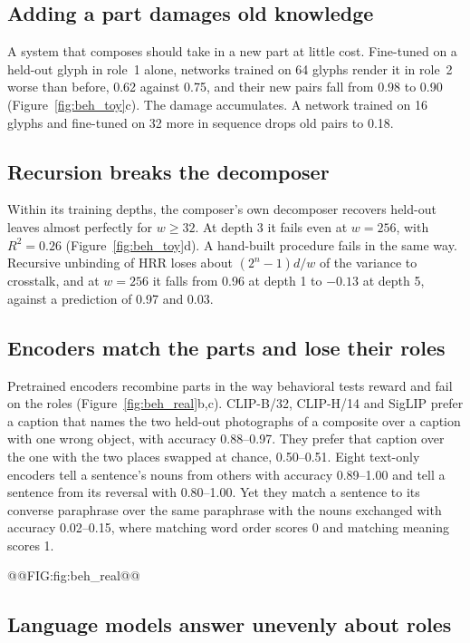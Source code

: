 \subsection{Adding a part damages old knowledge}
\label{sec:adding}

A system that composes should take in a new part at little cost. Fine-tuned on a held-out glyph in role~1 alone, networks trained on 64 glyphs render it in role~2 worse than before, 0.62 against 0.75, and their new pairs fall from 0.98 to 0.90 (Figure~\ref{fig:beh_toy}c). The damage accumulates. A network trained on 16 glyphs and fine-tuned on 32 more in sequence drops old pairs to 0.18.

\subsection{Recursion breaks the decomposer}
\label{sec:depth}

Within its training depths, the composer's own decomposer recovers held-out leaves almost perfectly for $w \ge 32$. At depth 3 it fails even at $w = 256$, with $R^2 = 0.26$ (Figure~\ref{fig:beh_toy}d). A hand-built procedure fails in the same way. Recursive unbinding of HRR loses about $(2^n - 1)d/w$ of the variance to crosstalk, and at $w = 256$ it falls from 0.96 at depth 1 to $-0.13$ at depth 5, against a prediction of 0.97 and 0.03.

\subsection{Encoders match the parts and lose their roles}
\label{sec:beh_encoders}

Pretrained encoders recombine parts in the way behavioral tests reward and fail on the roles (Figure~\ref{fig:beh_real}b,c). CLIP-B/32, CLIP-H/14 and SigLIP prefer a caption that names the two held-out photographs of a composite over a caption with one wrong object, with accuracy 0.88--0.97. They prefer that caption over the one with the two places swapped at chance, 0.50--0.51. Eight text-only encoders tell a sentence's nouns from others with accuracy 0.89--1.00 and tell a sentence from its reversal with 0.80--1.00. Yet they match a sentence to its converse paraphrase over the same paraphrase with the nouns exchanged with accuracy 0.02--0.15, where matching word order scores 0 and matching meaning scores 1.

@@FIG:fig:beh_real@@

\subsection{Language models answer unevenly about roles}
\label{sec:beh_lm}

